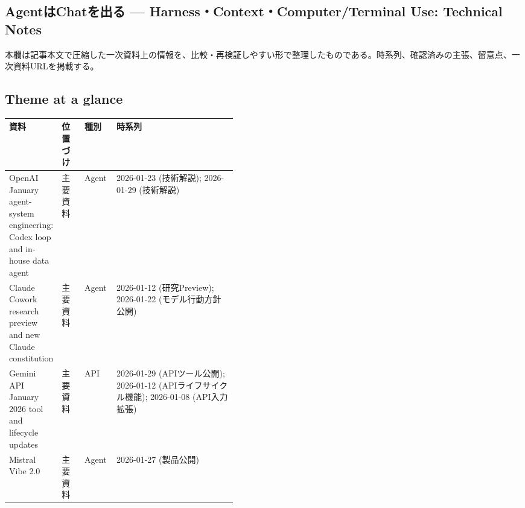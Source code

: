 \subsection*{AgentはChatを出る — Harness・Context・Computer/Terminal Use: Technical Notes}
本欄は記事本文で圧縮した一次資料上の情報を、比較・再検証しやすい形で整理したものである。時系列、確認済みの主張、留意点、一次資料URLを掲載する。
\medskip
\subsection*{Theme at a glance}
\begin{center}
\footnotesize
\begin{tabularx}{\linewidth}{@{}p{0.20\linewidth}p{0.10\linewidth}p{0.14\linewidth}X@{}}
\toprule
資料 & 位置づけ & 種別 & 時系列 \\
\midrule
OpenAI January agent-system engineering: Codex loop and in-house data agent & 主要資料 & Agent & 2026-01-23 (技術解説); 2026-01-29 (技術解説) \\
Claude Cowork research preview and new Claude constitution & 主要資料 & Agent & 2026-01-12 (研究Preview); 2026-01-22 (モデル行動方針公開) \\
Gemini API January 2026 tool and lifecycle updates & 主要資料 & API & 2026-01-29 (APIツール公開); 2026-01-12 (APIライフサイクル機能); 2026-01-08 (API入力拡張) \\
Mistral Vibe 2.0 & 主要資料 & Agent & 2026-01-27 (製品公開) \\
\bottomrule
\end{tabularx}
\end{center}
\normalsize

